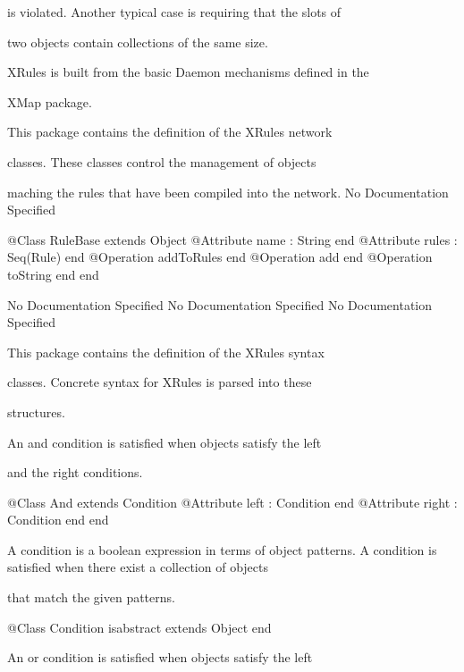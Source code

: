       is violated. Another typical case is requiring that the slots of

      two objects contain collections of the same size.
      
      XRules is built from the basic Daemon mechanisms defined in the

      XMap package.

      This package contains the definition of the XRules network

      classes. These classes control the management of objects

      maching the rules that have been compiled into the network.
No Documentation Specified
\begin{Interface}
@Class RuleBase extends Object
  @Attribute name : String end
  @Attribute rules : Seq(Rule) end
  @Operation addToRules end
  @Operation add end
  @Operation toString end
end
\end{Interface}
No Documentation Specified
No Documentation Specified
No Documentation Specified

      This package contains the definition of the XRules syntax

      classes. Concrete syntax for XRules is parsed into these

      structures.

      An and condition is satisfied when objects satisfy the left

      and the right conditions.
\begin{Interface}
@Class And extends Condition
  @Attribute left : Condition end
  @Attribute right : Condition end
end
\end{Interface}

      A condition is a boolean expression in terms of object patterns.
      A condition is satisfied when there exist a collection of objects

      that match the given patterns.
\begin{Interface}
@Class Condition isabstract extends Object
end
\end{Interface}

      An or condition is satisfied when objects satisfy the left

